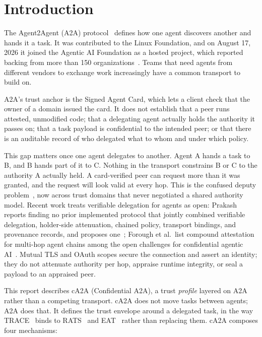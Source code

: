 \section{Introduction}\label{sec:intro}

The Agent2Agent (A2A) protocol~\citep{a2a2026} defines how one agent discovers another and hands
it a task. It was contributed to the Linux Foundation, and on August 17, 2026 it joined the
Agentic AI Foundation as a hosted project, which reported backing from more than 150
organizations~\citep{aaifa2a2026}. Teams that need agents from different vendors to exchange work
increasingly have a common transport to build on.

A2A's trust anchor is the Signed Agent Card, which lets a client check that the owner of a
domain issued the card. It does not establish that a peer runs attested, unmodified code; that a
delegating agent actually holds the authority it passes on; that a task payload is confidential
to the intended peer; or that there is an auditable record of who delegated what to whom and
under which policy.

This gap matters once one agent delegates to another. Agent A hands a task to B, and B hands
part of it to C. Nothing in the transport constrains B or C to the authority A actually held. A
card-verified peer can request more than it was granted, and the request will look valid at every
hop. This is the confused deputy problem~\citep{confuseddeputy1988}, now across trust domains
that never negotiated a shared authority model. Recent work treats verifiable delegation for
agents as open: Prakash reports finding no prior implemented protocol that jointly combined
verifiable delegation, holder-side attenuation, chained policy, transport bindings, and provenance
records, and proposes one~\citep{aip2026}; Forough et al.\ list compound attestation for multi-hop
agent chains among the open challenges for confidential agentic AI~\citep{secretssurvey2026}.
Mutual TLS and OAuth scopes secure the connection and assert an identity; they do not attenuate
authority per hop, appraise runtime integrity, or seal a payload to an appraised peer.

This report describes cA2A (Confidential A2A), a trust \emph{profile} layered on A2A rather than a
competing transport. cA2A does not move tasks between agents; A2A does that. It defines the trust
envelope around a delegated task, in the way TRACE~\citep{trace2025} binds to
RATS~\citep{rats2021} and EAT~\citep{eat2023} rather than replacing them. cA2A composes four
mechanisms:

